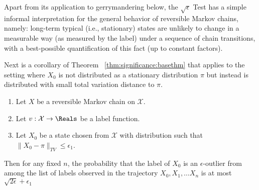 \documentclass[12pt]{article}
\begin{document}
Apart from its application to gerrymandering below, the \( \sqrt{\epsilon}
\) Test has a simple informal interpretation for the general behavior of
reversible Markov chains, namely:  long-term typical (i.e., stationary)
states are unlikely to change in a measurable way (as measured by the
label) under a sequence of chain transitions, with a best-possible
quantification of this fact (up to constant factors).

Next is a corollary of Theorem~%
\ref{thm:significance:basethm} that applies to the setting where \( X_0
\) is not distributed as a stationary distribution \( \pi \) but instead
is distributed with small total variation distance to \( \pi \).

\begin{corollary}
    \begin{enumerate}
        \item
            Let \( X \) be a reversible Markov chain on \( \mathcal{X} \).
        \item
            Let \( v :  \mathcal{X} \to \Reals \) be a label function.
        \item
            Let \( X_0 \) be a state chosen from \( \mathcal{X} \) with
            distribution such that \( \| X_0 - \pi \|_{TV} \le \epsilon_1
            \).
    \end{enumerate}
    Then for any fixed \( n \), the probability that the label of \( X_0
    \) is an \( \epsilon \)-outlier from among the list of labels
    observed in the trajectory \( X_0, X_1, \dots X_n \) is at most \(
    \sqrt{2\epsilon} + \epsilon_1 \)
\end{corollary}
\end{document}
